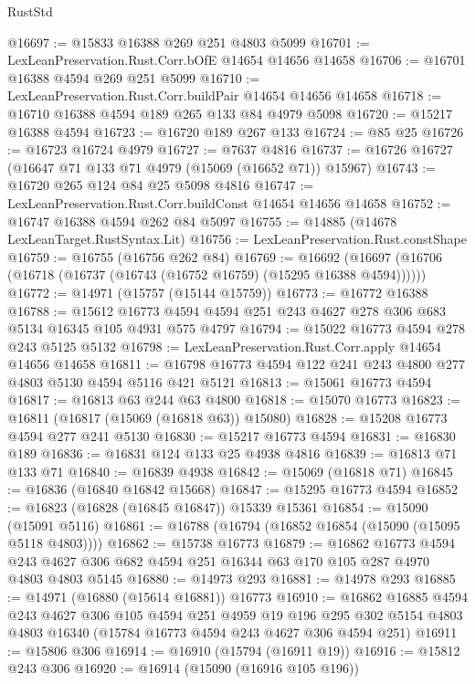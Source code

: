 \begin{lexlean}{RustStd}
\begin{coremodule}
@16697 := @15833 @16388 @269 @251 @4803 @5099
@16701 := LexLeanPreservation.Rust.Corr.bOfE @14654 @14656 @14658
@16706 := @16701 @16388 @4594 @269 @251 @5099
@16710 := LexLeanPreservation.Rust.Corr.buildPair @14654 @14656 @14658
@16718 := @16710 @16388 @4594 @189 @265 @133 @84 @4979 @5098
@16720 := @15217 @16388 @4594
@16723 := @16720 @189 @267 @133
@16724 := @85 @25
@16726 := @16723 @16724 @4979
@16727 := @7637 @4816
@16737 := @16726 @16727 (@16647 @71 @133 @71 @4979 (@15069 (@16652 @71)) @15967)
@16743 := @16720 @265 @124 @84 @25 @5098 @4816
@16747 := LexLeanPreservation.Rust.Corr.buildConst @14654 @14656 @14658
@16752 := @16747 @16388 @4594 @262 @84 @5097
@16755 := @14885 (@14678 LexLeanTarget.RustSyntax.Lit)
@16756 := LexLeanPreservation.Rust.constShape
@16759 := @16755 (@16756 @262 @84)
@16769 := @16692 (@16697 (@16706 (@16718 (@16737 (@16743 (@16752 @16759) (@15295 @16388 @4594))))))
@16772 := @14971 (@15757 (@15144 @15759))
@16773 := @16772 @16388
@16788 := @15612
    @16773
    @4594
    @4594
    @251
    @243
    @4627
    @278
    @306
    @683
    @5134
    @16345
    @105
    @4931
    @575
    @4797
@16794 := @15022 @16773 @4594 @278 @243 @5125 @5132
@16798 := LexLeanPreservation.Rust.Corr.apply @14654 @14656 @14658
@16811 := @16798 @16773 @4594 @122 @241 @243 @4800 @277 @4803 @5130 @4594 @5116 @421 @5121
@16813 := @15061 @16773 @4594
@16817 := @16813 @63 @244 @63 @4800
@16818 := @15070 @16773
@16823 := @16811 (@16817 (@15069 (@16818 @63)) @15080)
@16828 := @15208 @16773 @4594 @277 @241 @5130
@16830 := @15217 @16773 @4594
@16831 := @16830 @189
@16836 := @16831 @124 @133 @25 @4938 @4816
@16839 := @16813 @71 @133 @71
@16840 := @16839 @4938
@16842 := @15069 (@16818 @71)
@16845 := @16836 (@16840 @16842 @15668)
@16847 := @15295 @16773 @4594
@16852 := @16823 (@16828 (@16845 @16847)) @15339 @15361
@16854 := @15090 (@15091 @5116)
@16861 := @16788 (@16794 (@16852 @16854 (@15090 (@15095 @5118 @4803))))
@16862 := @15738 @16773
@16879 := @16862
    @16773
    @4594
    @243
    @4627
    @306
    @682
    @4594
    @251
    @16344
    @63
    @170
    @105
    @287
    @4970
    @4803
    @4803
    @5145
@16880 := @14973 @293
@16881 := @14978 @293
@16885 := @14971 (@16880 (@15614 @16881)) @16773
@16910 := @16862
    @16885
    @4594
    @243
    @4627
    @306
    @105
    @4594
    @251
    @4959
    @19
    @196
    @295
    @302
    @5154
    @4803
    @4803
    @16340
    (@15784 @16773 @4594 @243 @4627 @306 @4594 @251)
@16911 := @15806 @306
@16914 := @16910 (@15794 (@16911 @19))
@16916 := @15812 @243 @306
@16920 := @16914 (@15090 (@16916 @105 @196))

\end{coremodule}
\end{lexlean}
